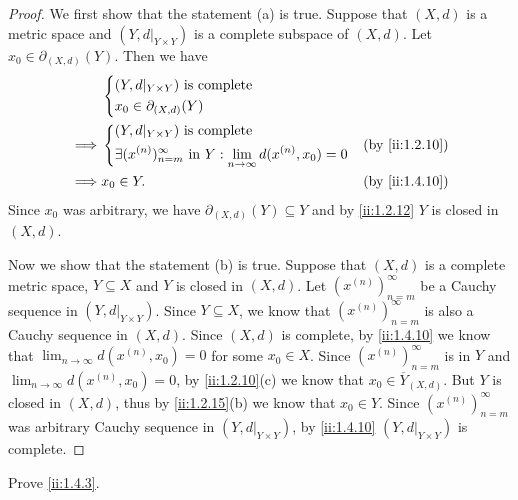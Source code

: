 \begin{proof}
  We first show that the statement (a) is true.
  Suppose that \((X, d)\) is a metric space and \((Y, d|_{Y \times Y})\) is a complete subspace of \((X, d)\).
  Let \(x_0 \in \partial_{(X, d)}(Y)\).
  Then we have
  \begin{align*}
             & \begin{dcases}
                 (Y, d|_{Y \times Y}) \text{ is complete} \\
                 x_0 \in \partial_{(X, d)}(Y)
               \end{dcases}                                                                                            \\
    \implies & \begin{dcases}
                 (Y, d|_{Y \times Y}) \text{ is complete} \\
                 \exists (x^{(n)})_{n = m}^\infty \text{ in } Y : \lim_{n \to \infty} d(x^{(n)}, x_0) = 0
               \end{dcases} &  & \by{ii:1.2.10}                      \\
    \implies & x_0 \in Y.                                                                                                      &  & \by{ii:1.4.10}
  \end{align*}
  Since \(x_0\) was arbitrary, we have \(\partial_{(X, d)}(Y) \subseteq Y\) and by \cref{ii:1.2.12} \(Y\) is closed in \((X, d)\).

  Now we show that the statement (b) is true.
  Suppose that \((X, d)\) is a complete metric space, \(Y \subseteq X\) and \(Y\) is closed in \((X, d)\).
  Let \((x^{(n)})_{n = m}^\infty\) be a Cauchy sequence in \((Y, d|_{Y \times Y})\).
  Since \(Y \subseteq X\), we know that \((x^{(n)})_{n = m}^\infty\) is also a Cauchy sequence in \((X, d)\).
  Since \((X, d)\) is complete, by \cref{ii:1.4.10} we know that \(\lim_{n \to \infty} d(x^{(n)}, x_0) = 0\) for some \(x_0 \in X\).
  Since \((x^{(n)})_{n = m}^\infty\) is in \(Y\) and \(\lim_{n \to \infty} d(x^{(n)}, x_0) = 0\), by \cref{ii:1.2.10}(c) we know that \(x_0 \in \overline{Y}_{(X, d)}\).
  But \(Y\) is closed in \((X, d)\), thus by \cref{ii:1.2.15}(b) we know that \(x_0 \in Y\).
  Since \((x^{(n)})_{n = m}^\infty\) was arbitrary Cauchy sequence in \((Y, d|_{Y \times Y})\), by \cref{ii:1.4.10} \((Y, d|_{Y \times Y})\) is complete.
\end{proof}

\exercisesection

\begin{ex}\label{ii:ex:1.4.1}
  Prove \cref{ii:1.4.3}.
\end{ex}

